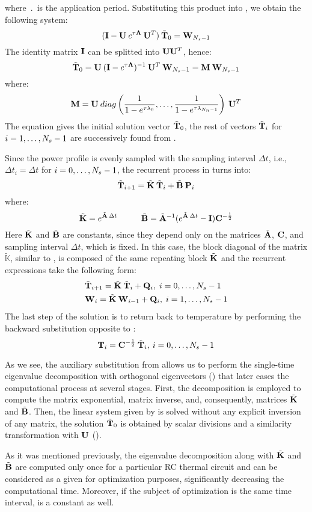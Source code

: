 where $\period$ is the application period. Substituting this product into , we obtain the following system:
\[
  (\mathbf{I} - \mathbf{U} \: e^{\tau \mathbf{\Lambda}} \: \mathbf{U}^T) \: \tilde{\mathbf{T}}_0 = \mathbf{W}_{N_s - 1}
\]
The identity matrix $\mathbf{I}$ can be splitted into $\mathbf{U} \mathbf{U}^T$, hence:
\[
  \tilde{\mathbf{T}}_0 = \mathbf{U} \: (\mathbf{I} - e^{\tau \mathbf{\Lambda}})^{-1} \: \mathbf{U}^T \: \mathbf{W}_{N_s - 1} = \mathbf{M} \: \mathbf{W}_{N_s - 1}
\]
where:
\begin{equation} \label{eq:m-matrix}
  \mathbf{M} = \mathbf{U} \: diag \left( \frac{1}{1 - e^{\tau \lambda_0}}, \dots, \frac{1}{1 - e^{\tau \lambda_{N_n - 1}}} \right) \: \mathbf{U}^T
\end{equation}
The equation gives the initial solution vector $\tilde{\mathbf{T}}_0$, the rest of vectors $\tilde{\mathbf{T}}_i$ for $i = 1, \dots, N_s - 1$ are successively found from .

Since the power profile is evenly sampled with the sampling interval $\Delta t$, i.e., $\Delta t_i = \Delta t$ for $i = 0, \dots, N_s - 1$, the recurrent process in  turns into:
\[
  \tilde{\mathbf{T}}_{i+1} = \tilde{\mathbf{K}} \: \tilde{\mathbf{T}}_i + \tilde{\mathbf{B}} \: \mathbf{P}_i
\]
where:
\[
  \tm{K} = e^{\tm{A} \: \Delta t} \hs \tm{B} = \tm{A}^{-1} ( e^{\tm{A} \: \Delta t} - \m{I} ) \m{C}^{-\frac{1}{2}}
\]
Here $\tilde{\mathbf{K}}$ and $\tilde{\mathbf{B}}$ are constants, since they depend only on the matrices $\tilde{\mathbf{A}}$, $\mathbf{C}$, and sampling interval $\Delta t$, which is fixed. In this case, the block diagonal of the matrix $\tilde{\mathbb{K}}$, similar to , is composed of the same repeating block $\tilde{\mathbf{K}}$ and the recurrent expressions take the following form:
\begin{align}
  & \tilde{\mathbf{T}}_{i + 1} = \tilde{\mathbf{K}} \: \tilde{\mathbf{T}}_i + \mathbf{Q}_i, \; i = 0, \dots, N_s - 1 \nonumber \\
  & \mathbf{W}_i = \tilde{\mathbf{K}} \: \mathbf{W}_{i - 1} + \mathbf{Q}_i, \; i = 1, \dots, N_s - 1 \nonumber
\end{align}
The last step of the solution is to return back to temperature by performing the backward substitution opposite to :
\[
  \mathbf{T}_i = \mathbf{C}^{-\frac{1}{2}} \: \tilde{\mathbf{T}}_i, \: i = 0, \dots, N_s - 1
\]

As we see, the auxiliary substitution from  allows us to perform the single-time eigenvalue decomposition with orthogonal eigenvectors () that later eases the computational process at several stages. First, the decomposition is employed to compute the matrix exponential, matrix inverse, and, consequently, matrices $\tilde{\mathbf{K}}$ and $\tilde{\mathbf{B}}$. Then, the linear system given by  is solved without any explicit inversion of any matrix, the solution $\tilde{\mathbf{T}}_0$ is obtained by scalar divisions and a similarity transformation with $\mathbf{U}$ ().

As it was mentioned previously, the eigenvalue decomposition along with $\tilde{\mathbf{K}}$ and $\tilde{\mathbf{B}}$ are computed only once for a particular RC thermal circuit and can be considered as a given for optimization purposes, significantly decreasing the computational time. Moreover, if the subject of optimization is the same time interval,  is a constant as well.
